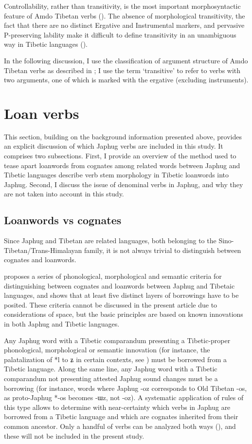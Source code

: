 \documentclass[oldfontcommands,oneside,a4paper,11pt]{article}
\newcommand{\ipa}[1]{{\phon \mbox{#1}}} %
\begin{document}
Controllability, rather than transitivity, is the most important morphosyntactic feature of Amdo Tibetan verbs (\citealt[74-75, 136]{haller04themchen}). The absence of morphological transitivity, the fact that there are no distinct Ergative and Instrumental markers, and pervasive P-preserving lability make it difficult to define transitivity in an unambiguous way in Tibetic languages (\citealt{tournadre96erg}).

In the following discussion, I use the classification of argument structure of Amdo Tibetan verbs as described in \citet{haller04themchen}; I use the term `transitive' to refer to verbs with two arguments, one of which is marked with the ergative (excluding instruments). 


\section{Loan verbs}
This section, building on the background information presented above, provides an explicit discussion of which Japhug verbs are included in this study. It comprises two subsections. First, I provide an overview of the method used to tease apart loanwords from cognates among related words between Japhug and Tibetic languages describe verb stem morphology in Tibetic loanwords into Japhug. Second, I discuss the issue of denominal verbs in Japhug, and why they are not taken into account in this study. 

\subsection{Loanwords vs cognates} \label{sec:layers}
Since Japhug and Tibetan are related languages, both belonging to the Sino-Tibetan/Trans-Himalayan family, it is not always trivial to distinguish between cognates and loanwords. 

\citet[83-200]{jacques04these} proposes a series of phonological, morphological and semantic criteria for distinguishing between cognates and  loanwords between Japhug and Tibetaic languages, and shows that at least five distinct layers of borrowings have to be posited. These criteria cannot be discussed in the present article due to considerations of space, but the basic principles are based on known innovations in both Japhug and Tibetic languages. 

Any Japhug word with a Tibetic comparandum presenting a Tibetic-proper phonological, morphological or semantic innovation (for instance, the palatalization of *l to \ipa{ʑ} in certain contexts, see \citealt{hill13laterals}) must be borrowed from a Tibetic language. Along the same line, any Japhug word with a Tibetic comparandum not presenting attested Japhug sound changes must be a borrowing (for instance, words where Japhug \ipa{-oz} corresponds to Old Tibetan \ipa{-os}, as proto-Japhug *\ipa{-os} becomes \ipa{-ɯz}, not \ipa{-oz}). A systematic application of rules of this type allows to determine with near-certainty which verbs in Japhug are borrowed from a Tibetic language and which are cognates inherited from their common ancestor. Only a handful of verbs can be analyzed both ways (\citealt[164]{jacques04these}), and these will not be included in the present study. 
\end{document}
